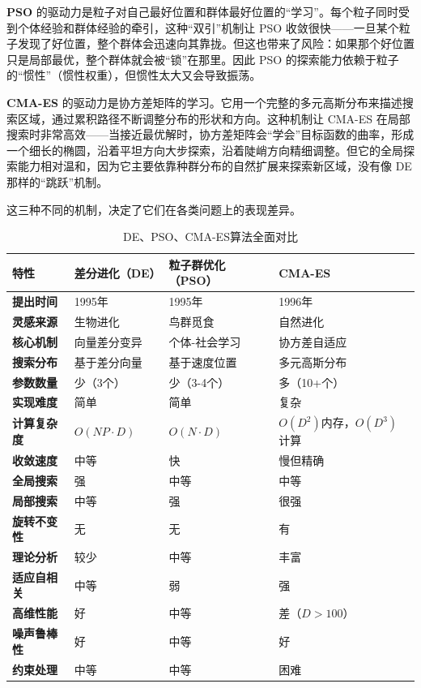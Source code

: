\documentclass[lang=cn,zihao=-4,a4paper,fontset=windows]{beautybook}
\begin{document}
\textbf{PSO} 的驱动力是粒子对自己最好位置和群体最好位置的“学习”。每个粒子同时受到个体经验和群体经验的牵引，这种“双引”机制让 PSO 收敛很快——一旦某个粒子发现了好位置，整个群体会迅速向其靠拢。但这也带来了风险：如果那个好位置只是局部最优，整个群体就会被“锁”在那里。因此 PSO 的探索能力依赖于粒子的“惯性”（惯性权重），但惯性太大又会导致振荡。

\textbf{CMA-ES} 的驱动力是协方差矩阵的学习。它用一个完整的多元高斯分布来描述搜索区域，通过累积路径不断调整分布的形状和方向。这种机制让 CMA-ES 在局部搜索时非常高效——当接近最优解时，协方差矩阵会“学会”目标函数的曲率，形成一个细长的椭圆，沿着平坦方向大步探索，沿着陡峭方向精细调整。但它的全局探索能力相对温和，因为它主要依靠种群分布的自然扩展来探索新区域，没有像 DE 那样的“跳跃”机制。

这三种不同的机制，决定了它们在各类问题上的表现差异。

\begin{table}[h]
\centering
\caption{DE、PSO、CMA-ES算法全面对比}
\begin{tabular}{p{}p{}p{}p{}}
\toprule
\textbf{特性} & \textbf{差分进化（DE）} & \textbf{粒子群优化（PSO）} & \textbf{CMA-ES} \\
\midrule
\textbf{提出时间} & 1995年 & 1995年 & 1996年 \\
\textbf{灵感来源} & 生物进化 & 鸟群觅食 & 自然进化 \\
\textbf{核心机制} & 向量差分变异 & 个体-社会学习 & 协方差自适应 \\
\textbf{搜索分布} & 基于差分向量 & 基于速度位置 & 多元高斯分布 \\
\textbf{参数数量} & 少（3个） & 少（3-4个） & 多（10+个） \\
\textbf{实现难度} & 简单 & 简单 & 复杂 \\
\textbf{计算复杂度} & $O(NP \cdot D)$ & $O(N \cdot D)$ & $O(D^2)$内存，$O(D^3)$计算 \\
\textbf{收敛速度} & 中等 & 快 & 慢但精确 \\
\textbf{全局搜索} & 强 & 中等 & 中等 \\
\textbf{局部搜索} & 中等 & 强 & 很强 \\
\textbf{旋转不变性} & 无 & 无 & 有 \\
\textbf{理论分析} & 较少 & 中等 & 丰富 \\
\textbf{适应自相关} & 中等 & 弱 & 强 \\
\textbf{高维性能} & 好 & 中等 & 差（$D>100$） \\
\textbf{噪声鲁棒性} & 好 & 中等 & 好 \\
\textbf{约束处理} & 中等 & 中等 & 困难 \\
\bottomrule
\end{tabular}
\end{table}
\end{document}
